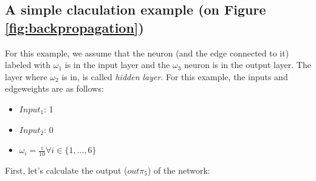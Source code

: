 \subsection{A simple claculation example (on Figure \ref{fig:backpropagation})}
\label{subs:Example}

For this example, we assume that the neuron (and the edge connected to it) labeled with $\omega_1$ is in the input layer and the $\omega_3$ neuron is in the output layer. The layer where $\omega_2$ is in, is called \textit{hidden layer}. For this example, the inputs and edgeweights are as follows:
\begin{itemize}
	\item $Input_1$: 1
	\item $Input_2$: 0
	\item $\omega_i=\frac{i}{10}\forall i \in \{1,...,6\}$
\end{itemize}
First, let's calculate the output ($out\pi_5$) of the network:

